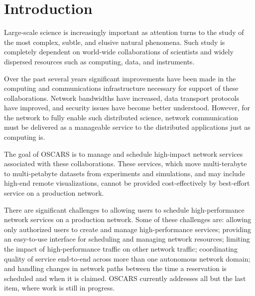 \documentclass[conference]{IEEEtran}
\begin{document}


\IEEEpeerreviewmaketitle

\section{Introduction}
Large-scale science is increasingly important as attention turns to the
study of the most complex, subtle, and elusive natural phenomena.  Such
study is completely dependent on world-wide collaborations of scientists
and widely dispersed resources such as computing, data, and instruments.

Over the past several years significant improvements have been made in the
computing and communications infrastructure necessary for support of these
collaborations.  Network bandwidths have increased, data transport protocols
have improved, and security issues have become better understood.  However,
for the network to fully enable such distributed science, network
communication must be delivered as a manageable service to the distributed
applications just as computing is.
 
The goal of OSCARS is to manage and schedule high-impact network services
associated with these collaborations.  These services, which move 
multi-terabyte to multi-petabyte datasets from experiments and simulations,
and may include high-end remote visualizations, cannot be provided 
cost-effectively by best-effort service on a production network.

There are significant challenges to allowing users to schedule high-performance 
network services on a production network. Some of these challenges are: 
allowing only authorized users to create and manage high-performance services;
providing an easy-to-use interface for scheduling and managing network 
resources; limiting the impact of high-performance traffic on other network
traffic; coordinating quality of service end-to-end 
across more than one autonomous network domain;
and handling changes in network paths between the time a reservation is
scheduled and when it is claimed.  OSCARS currently addresses all but the
last item, where work is still in progress.
\end{document}

